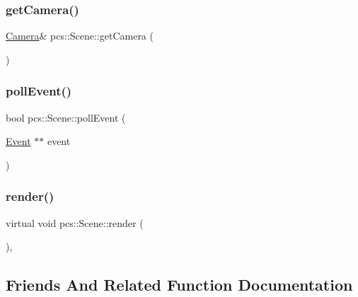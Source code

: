 \subsubsection{\texorpdfstring{get\+Camera()}{getCamera()}}
{\footnotesize\ttfamily \hyperlink{classpcs_1_1Camera}{Camera}\& pcs\+::\+Scene\+::get\+Camera (\begin{DoxyParamCaption}{ }\end{DoxyParamCaption})\hspace{0.3cm}{\ttfamily [inline]}}

\mbox{\label{classpcs_1_1Scene_ab6c463fedfc6499998d55206aa9afeb9}} 
\subsubsection{\texorpdfstring{poll\+Event()}{pollEvent()}}
{\footnotesize\ttfamily bool pcs\+::\+Scene\+::poll\+Event (\begin{DoxyParamCaption}\item[{\hyperlink{classpcs_1_1Event}{Event} $\ast$$\ast$}]{event }\end{DoxyParamCaption})\hspace{0.3cm}{\ttfamily [protected]}}

\mbox{\label{classpcs_1_1Scene_ad1ed5ae1d53a533e2970de85093a4bc4}} 
\subsubsection{\texorpdfstring{render()}{render()}}
{\footnotesize\ttfamily virtual void pcs\+::\+Scene\+::render (\begin{DoxyParamCaption}{ }\end{DoxyParamCaption})\hspace{0.3cm}{\ttfamily [protected]}, {}}



\subsection{Friends And Related Function Documentation}
\mbox{\label{classpcs_1_1Scene_a3e1914489e4bed4f9f23cdeab34a43dc}} 
